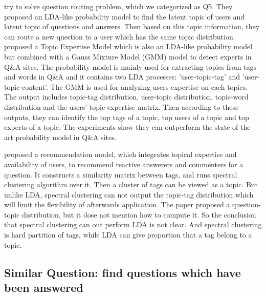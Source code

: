 \cite{Guo:2008:TPQ:1458082.1458204} %
try to solve question routing problem, which we categorized as Q5. They proposed an LDA-like probability model to find the latent topic of users and latent topic of questions and answers. Then based on this topic information, they can route a new question to a user which has the same topic distribution.
\cite{yang2013cqarank} %
proposed a Topic Expertise Model which is also an LDA-like probability model but combined with a Gauss Mixture Model (GMM) model to detect experts in Q\&A sites. The probability model is mainly used for extracting topics from tags and words in Q\&A and it contains two LDA processes: 'user-topic-tag' and 'user-topic-content'. The GMM is used for analyzing users expertise on each topics. The output includes topic-tag distribution, user-topic distribution, topic-word distribution and the users' topic-expertise matrix. Then according to these outputs, they can identify the top tags of a topic, top users of a topic and top experts of a topic. The experiments show they can outperform the state-of-the-art probability model in Q\&A sites.


\cite{Chang:2013}
proposed a recommendation model, which integrates topical expertise and availability of users, to recommend reactive answerers and commenters for a question. It constructs a similarity matrix between tags, and runs spectral clustering algorithm over it. Then a cluster of tags can be viewed as a topic. But unlike LDA, spectral clustering can not output the topic-tag distribution which will limit the flexibility of afterwards application. The paper proposed a question-topic distribution, but it dose not mention how to compute it. So the conclusion that spectral clustering can out perform LDA is not clear. And spectral clustering is hard partition of tags, while LDA can give proportion that a tag belong to a topic. 



\subsection{Similar Question: find questions which have been answered}

